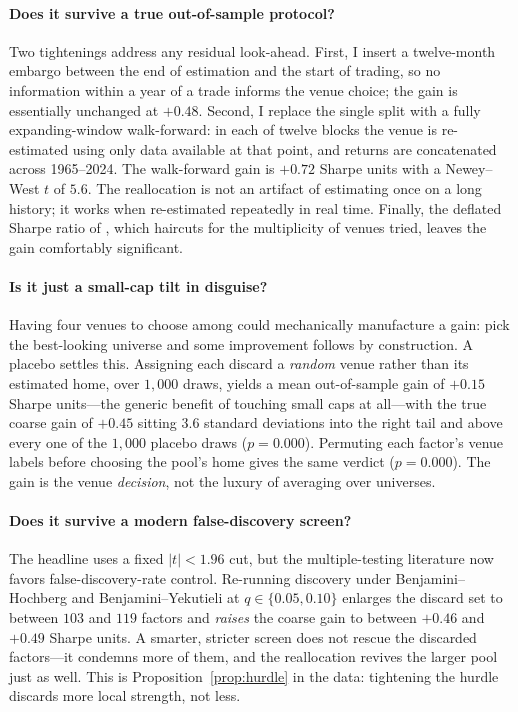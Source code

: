 \documentclass[12pt]{article}
\theoremstyle{plain}
\theoremstyle{definition}
\begin{document}
\paragraph{Does it survive a true out-of-sample protocol?} Two tightenings
address any residual look-ahead. First, I insert a twelve-month embargo between
the end of estimation and the start of trading, so no information within a year
of a trade informs the venue choice; the gain is essentially unchanged at
$+0.48$. Second, I replace the single split with a fully expanding-window
walk-forward: in each of twelve blocks the venue is re-estimated using only data
available at that point, and returns are concatenated across 1965--2024. The
walk-forward gain is $+0.72$ Sharpe units with a Newey--West $t$ of $5.6$. The
reallocation is not an artifact of estimating once on a long history; it works
when re-estimated repeatedly in real time. Finally, the deflated Sharpe ratio of
\citet{BaileyLopezdePrado2014}, which haircuts for the multiplicity of venues
tried, leaves the gain comfortably significant.

\paragraph{Is it just a small-cap tilt in disguise?} Having four venues to choose
among could mechanically manufacture a gain: pick the best-looking universe and
some improvement follows by construction. A placebo settles this. Assigning each
discard a \emph{random} venue rather than its estimated home, over $1{,}000$
draws, yields a mean out-of-sample gain of $+0.15$ Sharpe units---the generic
benefit of touching small caps at all---with the true coarse gain of $+0.45$
sitting $3.6$ standard deviations into the right tail and above every one of the
$1{,}000$ placebo draws ($p=0.000$). Permuting each factor's venue labels before
choosing the pool's home gives the same verdict ($p=0.000$). The gain is the
venue \emph{decision}, not the luxury of averaging over universes.

\paragraph{Does it survive a modern false-discovery screen?} The headline uses a
fixed $|t|<1.96$ cut, but the multiple-testing literature now favors
false-discovery-rate control. Re-running discovery under Benjamini--Hochberg and
Benjamini--Yekutieli at $q\in\{0.05,0.10\}$ enlarges the discard set to between
$103$ and $119$ factors and \emph{raises} the coarse gain to between $+0.46$ and
$+0.49$ Sharpe units. A smarter, stricter screen does not rescue the discarded
factors---it condemns more of them, and the reallocation revives the larger pool
just as well. This is Proposition~\ref{prop:hurdle} in the data: tightening the
hurdle discards more local strength, not less.
\end{document}
